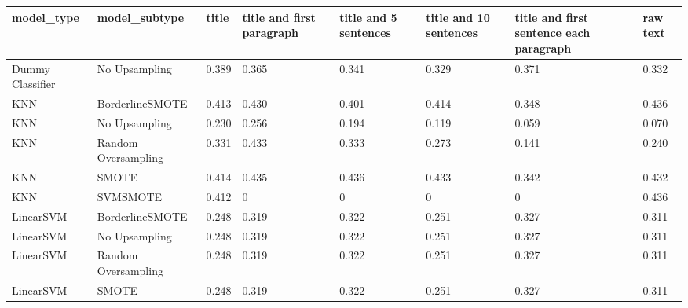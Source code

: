 \begin{tabular}{llllllll}
\toprule
                  model\_type &       model\_subtype & title & title and first paragraph & title and 5 sentences & title and 10 sentences & title and first sentence each paragraph &  raw text \\
\midrule
            Dummy Classifier &       No Upsampling & 0.389 &                     0.365 &                 0.341 &                  0.329 &                                   0.371 &     0.332 \\
                         KNN &     BorderlineSMOTE & 0.413 &                     0.430 &                 0.401 &                  0.414 &                                   0.348 &     0.436 \\
                         KNN &       No Upsampling & 0.230 &                     0.256 &                 0.194 &                  0.119 &                                   0.059 &     0.070 \\
                         KNN & Random Oversampling & 0.331 &                     0.433 &                 0.333 &                  0.273 &                                   0.141 &     0.240 \\
                         KNN &               SMOTE & 0.414 &                     0.435 &                 0.436 &                  0.433 &                                   0.342 &     0.432 \\
                         KNN &            SVMSMOTE & 0.412 &                         0 &                     0 &                      0 &                                       0 &     0.436 \\
                   LinearSVM &     BorderlineSMOTE & 0.248 &                     0.319 &                 0.322 &                  0.251 &                                   0.327 &     0.311 \\
                   LinearSVM &       No Upsampling & 0.248 &                     0.319 &                 0.322 &                  0.251 &                                   0.327 &     0.311 \\
                   LinearSVM & Random Oversampling & 0.248 &                     0.319 &                 0.322 &                  0.251 &                                   0.327 &     0.311 \\
                   LinearSVM &               SMOTE & 0.248 &                     0.319 &                 0.322 &                  0.251 &                                   0.327 &     0.311 \\

\end{tabular}
